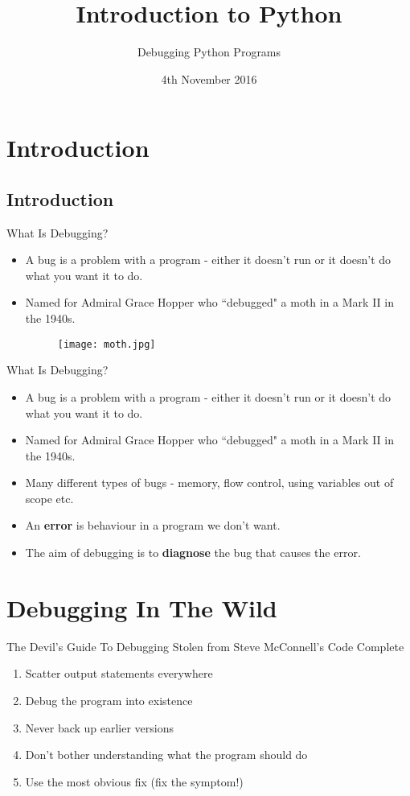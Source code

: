 \documentclass{beamer}
\title{Introduction to Python}
\subtitle{Debugging Python Programs}
\date{4th November 2016}
\begin{document}
\lstset{language=Python}

\begin{frame}
  \titlepage
\end{frame}

\section{Introduction}

\subsection{Introduction}
\begin{frame}[fragile]{What Is Debugging?}
  \begin{itemize}
  \item A bug is a problem with a program - either it doesn't run or it doesn't do what you want it to do.
  \pause
  \item{ Named for Admiral Grace Hopper who ``debugged" a moth in a Mark II in the 1940s. 
  \begin{figure}
  \texttt{[image: moth.jpg]}
  \end{figure}}
  \end{itemize}
\end{frame}
\begin{frame}[fragile]{What Is Debugging?}
  \begin{itemize}
  \item A bug is a problem with a program - either it doesn't run or it doesn't do what you want it to do.
  \item{ Named for Admiral Grace Hopper who ``debugged" a moth in a Mark II in the 1940s. }
  \item{ Many different types of bugs - memory, flow control, using variables out of scope etc.}
  \pause
  \item{ An \textbf{error} is behaviour in a program we don't want.}
  \pause
  \item { The aim of debugging is to \textbf{diagnose} the bug that causes the error. }
  \end{itemize}
\end{frame}

\section{Debugging In The Wild}
\begin{frame}[fragile]{The Devil's Guide To Debugging }
Stolen from Steve McConnell's Code Complete
\begin{enumerate}
\item{Scatter output statements everywhere}
\pause
\item{Debug the program into existence}
\pause
\item{Never back up earlier versions}
\pause
\item{Don't bother understanding what the program should do}
\pause
\item{Use the most obvious fix (fix the symptom!)}
\pause
\end{enumerate}
\end{frame}
\end{document}

